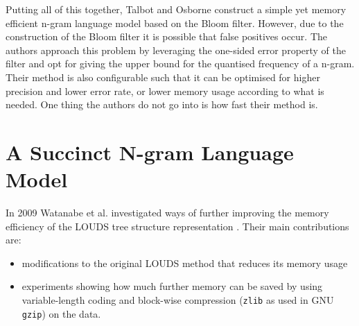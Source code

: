 \documentclass[sigconf, nonacm=true]{acmart}
\begin{document}
Putting all of this together, Talbot and Osborne construct a simple yet memory efficient n-gram language model based on the Bloom filter. However, due to the construction of the Bloom filter it is possible that false positives occur. The authors approach this problem by leveraging the one-sided error property of the filter and opt for giving the upper bound for the quantised frequency of a n-gram. Their method is also configurable such that it can be optimised for higher precision and lower error rate, or lower memory usage according to what is needed. One thing the authors do not go into is how fast their method is.

\section{A Succinct N-gram Language Model} 
In 2009 Watanabe et al. \cite{watanabe2009succinct} investigated ways of further improving the memory efficiency of the LOUDS tree structure representation \cite{jacobson1989space, rahman2006engineering}.
Their main contributions are:
\begin{itemize}
    \item modifications to the original LOUDS method that reduces its memory usage
    \item experiments showing how much further memory can be saved by using variable-length coding and block-wise compression (\verb|zlib| as used in GNU \verb|gzip|) on the data.
\end{itemize}
\end{document}
